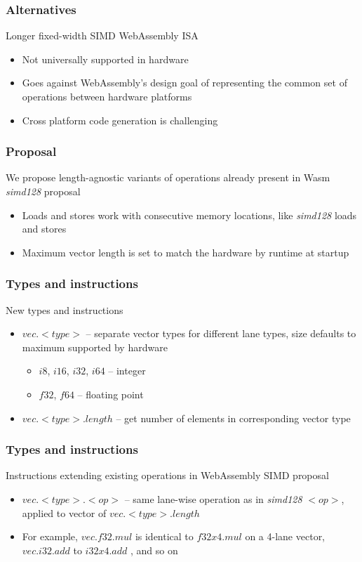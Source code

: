 \documentclass[t,aspectratio=169, xcolor={table}]{beamer}
\begin{document}
\begin{frame}
\frametitle{Alternatives}
  Longer fixed-width SIMD WebAssembly ISA
  \begin{itemize}
  \item Not universally supported in hardware
  \item Goes against WebAssembly's design goal of representing the common set of operations between hardware platforms
  \item Cross platform code generation is challenging
  \end{itemize}
\end{frame}
\begin{frame}
\frametitle{Proposal}
  We propose length-agnostic variants of operations already present in Wasm \textit{simd128} proposal
  \begin{itemize}
  \item Loads and stores work with consecutive memory locations, like \textit{simd128} loads and stores
  \item Maximum vector length is set to match the hardware by runtime at startup
  \end{itemize}
\end{frame}
\begin{frame}
\frametitle{Types and instructions}
New types and instructions
  \begin{itemize}
  \item $vec.<type>$ -- separate vector types for different lane types, size defaults to maximum supported by hardware
    \begin{itemize}
    \item $i8$, $i16$, $i32$, $i64$ -- integer
    \item $f32$, $f64$ -- floating point
    \end{itemize}
  \item $vec.<type>.length$ -- get number of elements in corresponding vector type
  \end{itemize}
\end{frame}
\begin{frame}
\frametitle{Types and instructions}
Instructions extending existing operations in WebAssembly SIMD proposal
  \begin{itemize}
  \item $vec.<type>.<op>$ -- same lane-wise operation as in \textit{simd128} $<op>$, applied to vector of $vec.<type>.length$
  \item[] For example, $vec.f32.mul$ is identical to $f32x4.mul$ on a 4-lane vector, $vec.i32.add$ to $i32x4.add$ , and so on
  \end{itemize}
\end{frame}
\end{document}
